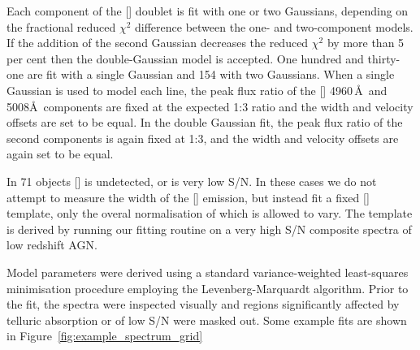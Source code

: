 Each component of the [] doublet is fit with one or two Gaussians, depending on the fractional reduced $\chi^2$ difference between the one- and two-component models. 
If the addition of the second Gaussian decreases the reduced $\chi^2$ by more than 5 per cent then the double-Gaussian model is accepted.
One hundred and thirty-one are fit with a single Gaussian and 154 with two Gaussians. 
When a single Gaussian is used to model each line, the peak flux ratio of the [] 4960\,\AA\, and 5008\AA\, components are fixed at the expected 1:3 ratio and the width and velocity offsets are set to be equal.
In the double Gaussian fit, the peak flux ratio of the second components is again fixed at 1:3, and the width and velocity offsets are again set to be equal. 

In 71 objects [] is undetected, or is very low S/N. 
In these cases we do not attempt to measure the width of the [] emission, but instead fit a fixed [] template, only the overal normalisation of which is allowed to vary. 
The template is derived by running our fitting routine on a very high S/N composite spectra of low redshift AGN. 

Model parameters were derived using a standard variance-weighted least-squares minimisation procedure employing the Levenberg-Marquardt algorithm. 
Prior to the fit, the spectra were inspected visually and regions significantly affected by telluric absorption or of low S/N were masked out.
Some example fits are shown in Figure~\ref{fig:example_spectrum_grid}

